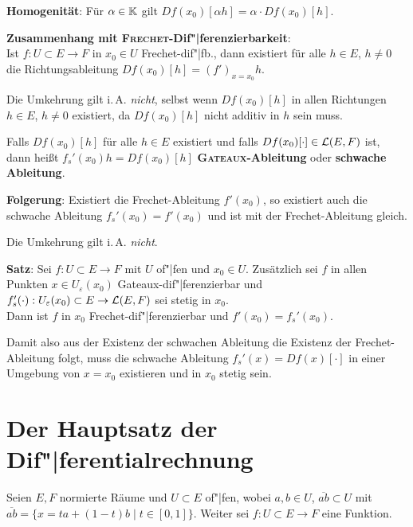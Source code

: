 \linie

\textbf{Homogenität}:
Für $\alpha \in \mathbb{K}$ gilt $Df(x_0)[\alpha h] = \alpha \cdot Df(x_0)[h]$.

\textbf{Zusammenhang mit \textsc{Frechet}-Dif"|ferenzierbarkeit}: \\
Ist $f: U \subset E \rightarrow F$ in $x_0 \in U$ Frechet-dif"|fb.,
dann existiert für alle $h \in E$, $h \not= 0$ die Richtungsableitung
$Df(x_0)[h] = (f')_{x=x_0}h$.

Die Umkehrung gilt i.\,A. \emph{nicht}, selbst wenn $Df(x_0)[h]$ in allen
Richtungen $h \in E$, $h \not= 0$ existiert,
da $Df(x_0)[h]$ nicht additiv in $h$ sein muss.

\linie

Falls $Df(x_0)[h]$ für alle $h \in E$ existiert und falls
$Df(x_0)[\cdot] \in \mathcal{L}(E,F)$ ist, \\
dann heißt $f_s'(x_0)h = Df(x_0)[h]$
\textbf{\textsc{Gateaux}-Ableitung} oder \textbf{schwache Ableitung}.

\textbf{Folgerung}:
Existiert die Frechet-Ableitung $f'(x_0)$, so existiert auch
die schwache Ableitung $f_s'(x_0) = f'(x_0)$ und ist mit der
Frechet-Ableitung gleich.

Die Umkehrung gilt i.\,A. \emph{nicht}.

\linie

\textbf{Satz}:
Sei $f: U \subset E \rightarrow F$ mit $U$ of"|fen und $x_0 \in U$.
Zusätzlich sei $f$ in allen Punkten $x \in U_\varepsilon(x_0)$
Gateaux-dif"|ferenzierbar und
$f_s'(\cdot): U_\varepsilon(x_0) \subset E \rightarrow \mathcal{L}(E,F)$ sei
stetig in $x_0$. \\
Dann ist $f$ in $x_0$ Frechet-dif"|ferenzierbar und $f'(x_0) = f_s'(x_0)$.

Damit also aus der Existenz der schwachen Ableitung die Existenz der
Frechet-Ableitung folgt, muss die schwache Ableitung
$f_s'(x) = Df(x)[\cdot]$ in einer Umgebung von $x = x_0$ existieren
und in $x_0$ stetig sein.

\section{%
    Der Hauptsatz der Dif"|ferentialrechnung%
}

Seien $E, F$ normierte Räume und $U \subset E$ of"|fen, wobei
$a, b \in U$, $\overline{ab} \subset U$ mit \\
$\overline{ab} = \{x = ta + (1 - t)b \;|\; t \in [0,1]\}$.
Weiter sei $f: U \subset E \rightarrow F$ eine Funktion.

